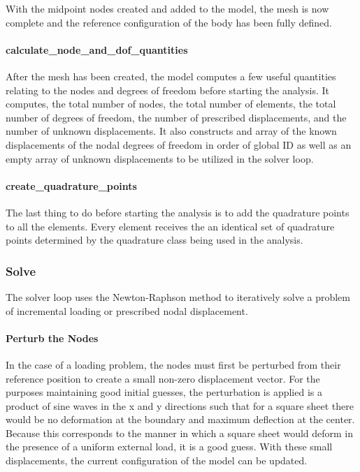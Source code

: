 \documentclass[]{spie}  %
\begin{document}
With the midpoint nodes created and added to the model, the mesh is now complete and the reference configuration of the body has been fully defined. 

\paragraph{calculate\_node\_and\_dof\_quantities}
After the mesh has been created, the model computes a few useful quantities relating to the nodes and degrees of freedom before starting the analysis. It computes, the total number of nodes, the total number of elements, the total number of degrees of freedom, the number of prescribed displacements, and the number of unknown displacements. It also constructs and array of the known displacements of the nodal degrees of freedom in order of global ID as well as an empty array of unknown displacements to be utilized in the solver loop. 

\paragraph{create\_quadrature\_points}
The last thing to do before starting the analysis is to add the quadrature points to all the elements. Every element receives the an identical set of quadrature points determined by the quadrature class being used in the analysis.

\subsubsection{Solve}
The solver loop uses the Newton-Raphson method to iteratively solve a problem of incremental loading or prescribed nodal displacement.

\paragraph{Perturb the Nodes} 
In the case of a loading problem, the nodes must first be perturbed from their reference position to create a small non-zero displacement vector. For the purposes maintaining good initial guesses, the perturbation is applied is a product of sine waves in the x and y directions such that for a square sheet there would be no deformation at the boundary and maximum deflection at the center. Because this corresponds to the manner in which a square sheet would deform in the presence of a uniform external load, it is a good guess. With these small displacements, the current configuration of the model can be updated. 
\end{document}
